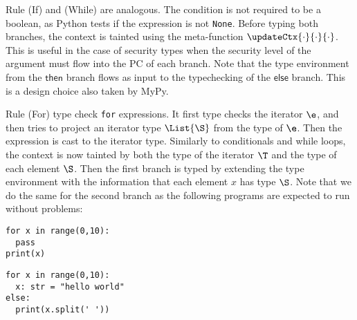 \documentclass[acmsmall,anonymous,review,screen,nonacm]{acmart}
\begin{document}
Rule (If) and (While) are analogous. The condition is not required to be a boolean, as Python tests if the expression is not \lstinline|None|. Before typing both branches, the context is tainted using the meta-function $\updateCtx{\cdot}{\cdot}{\cdot}$. This is useful in the case of security types when the security level of the argument must flow into the PC of each branch.
Note that the type environment from the $\mathsf{then}$ branch flows as input to the typechecking of the $\mathsf{else}$ branch. This is a design choice also taken by MyPy.

Rule (For) type check \lstinline|for| expressions. It first type checks the iterator $\e$, and then tries to project an iterator type $\List{\S}$ from the type of $\e$. Then the expression is cast to the iterator type. Similarly to conditionals and while loops, the context is now tainted by both the type of the iterator $\T$ and the type of each element $\S$.
Then the first branch is typed by extending the type environment with the information that each element $x$ has type $\S$. Note that we do the same for the second branch as the following programs are expected to run without problems:\\

\begin{minipage}[t]{0.4\textwidth}
\begin{lstlisting}
for x in range(0,10):
  pass
print(x)
\end{lstlisting}
\end{minipage}
\hfill
\begin{minipage}[t]{0.5\textwidth}
\begin{lstlisting}
for x in range(0,10):
  x: str = "hello world"
else:
  print(x.split(' '))
\end{lstlisting}
\end{minipage}
\end{document}
